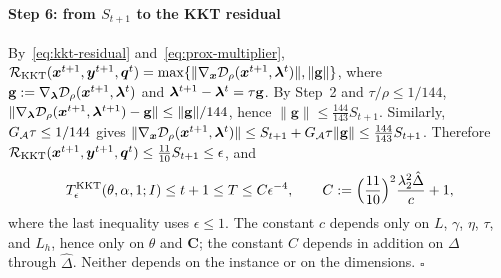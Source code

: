 \paragraph{Step 6: from \(S_{t+1}\) to the KKT residual}
By~\eqref{eq:kkt-residual} and~\eqref{eq:prox-multiplier},
\(\mathcal R_{\mathrm{KKT}}(\bm{x}^{t+1},\bm{y}^{t+1},\bm{q}^t)
=\max\{\|\nabla_{\bm{x}}\mathcal{D}_\rho(\bm{x}^{t+1},\bm{\lambda}^t)\|,\|\mathbf g\|\}\), where
\(\mathbf g:=\nabla_{\bm{\lambda}}\mathcal{D}_\rho(\bm{x}^{t+1},\bm{\lambda}^t)\) and
\(\bm{\lambda}^{t+1}-\bm{\lambda}^t=\tau\mathbf g\). By Step~2 and \(\tau/\rho\le1/144\),
\(\|\nabla_{\bm{\lambda}}\mathcal{D}_\rho(\bm{x}^{t+1},\bm{\lambda}^{t+1})-\mathbf g\|\le\|\mathbf g\|/144\),
hence \(\|\mathbf g\|\le\frac{144}{143}S_{t+1}\). Similarly,
\(G_{\mathcal{A}}\tau\le1/144\) gives
\(\|\nabla_{\bm{x}}\mathcal{D}_\rho(\bm{x}^{t+1},\bm{\lambda}^t)\|
\le S_{t+1}+G_{\mathcal{A}}\tau\|\mathbf g\|\le\frac{144}{143}S_{t+1}\). Therefore
\(\mathcal R_{\mathrm{KKT}}(\bm{x}^{t+1},\bm{y}^{t+1},\bm{q}^t)\le\frac{11}{10}S_{t+1}\le\epsilon\),
and
\[
T^{\mathrm{KKT}}_\epsilon(\theta,\alpha,1;I)\le t+1\le T\le C\epsilon^{-4},
\qquad
C:=\Bigl(\frac{11}{10}\Bigr)^2\frac{\lambda_2^2\hat\Delta}{c}+1,
\]
where the last inequality uses \(\epsilon\le1\). The constant \(c\) depends
only on \(L\), \(\gamma\), \(\eta\), \(\tau\), and \(L_h\), hence only on
\(\theta\) and \(\mathbf C\); the constant \(C\) depends in addition on
\(\Delta\) through \(\hat\Delta\). Neither depends on the instance or on the
dimensions.
\hfill\(\square\)
